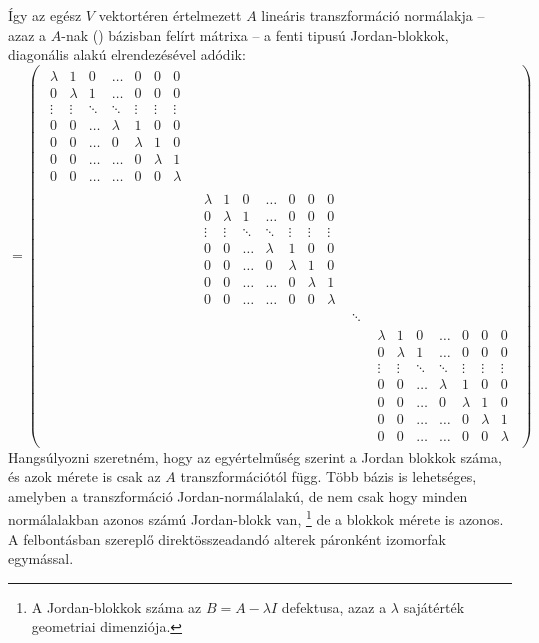 \documentclass[9pt, a4paper, showtrims]{memoir}
\theoremstyle{plain}
\theoremstyle{remark}
\theoremstyle{definition}
\begin{document}
Így az egész $V$ vektortéren értelmezett $A$ lineáris transzformáció normálakja 
--
azaz a $A$-nak (\dag) bázisban felírt mátrixa 
-- 
a fenti tipusú Jordan-blokkok, diagonális alakú elrendezésével adódik:
\begin{displaymath}
    [A]=
    \begin{pmatrix}
        \begin{matrix}
            \lambda&1&0&\dots& 0 &0&0\\
            0&\lambda&1&\dots& 0 &0&0\\
            \vdots&\vdots&\ddots&\ddots&\vdots&\vdots&\vdots\\
            0&0&\dots&\lambda& 1 &0&0\\
            0&0&\dots&0& \lambda&1&0\\
            0&0&\dots&\dots& 0 &\lambda&1\\
            0&0&\dots&\dots& 0 &0&\lambda
        \end{matrix}&&&\\
        &\!\!\!
        \begin{matrix}
            \lambda&1&0&\dots& 0 &0&0\\
            0&\lambda&1&\dots& 0 &0&0\\
            \vdots&\vdots&\ddots&\ddots&\vdots&\vdots&\vdots\\
            0&0&\dots&\lambda& 1 &0&0\\
            0&0&\dots&0& \lambda&1&0\\
            0&0&\dots&\dots& 0 &\lambda&1\\
            0&0&\dots&\dots& 0 &0&\lambda
        \end{matrix}
        &&\\
        &&\ddots&\\
        &&&
        \begin{matrix}
            \lambda&1&0&\dots& 0 &0&0\\
            0&\lambda&1&\dots& 0 &0&0\\
            \vdots&\vdots&\ddots&\ddots&\vdots&\vdots&\vdots\\
            0&0&\dots&\lambda& 1 &0&0\\
            0&0&\dots&0& \lambda&1&0\\
            0&0&\dots&\dots& 0 &\lambda&1\\
            0&0&\dots&\dots& 0 &0&\lambda
        \end{matrix}
    \end{pmatrix}
\end{displaymath}
Hangsúlyozni szeretném, hogy az egyértelműség szerint a Jordan blokkok száma, és azok mérete is csak
az $A$ transzformációtól függ.
Több bázis is lehetséges, amelyben a transzformáció Jordan-normálalakú, 
de nem csak hogy minden normálalakban azonos számú Jordan-blokk van,
\footnote{A Jordan-blokkok száma az $B=A-\lambda I$ defektusa, azaz a $\lambda$ sajátérték
    geometriai dimenziója.}
de a blokkok mérete is azonos.
A felbontásban szereplő direktösszeadandó alterek páronként izomorfak egymással.
\end{document}
